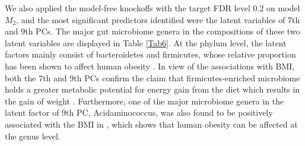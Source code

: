 \documentclass{statsoc}
\begin{document}
We also applied the model-free knockoffs \citep{Candes16} with the target FDR level $0.2$ on model $M_2$, and the most significant predictors identified were the latent variables of 7th and 9th PCs. The major gut microbiome genera in the compositions of these two latent variables are displayed in Table \ref{Tab6}. At the phylum level, the latent factors mainly consist of bacteroidetes and firmicutes, whose relative proportion has been shown to affect human obesity \citep{Ley2006}. In view of the associations with BMI, both the 7th and 9th PCs confirm the claim that firmicutes-enriched microbiome holds a greater metabolic potential for energy gain from the diet which results in the gain of weight \citep{Turnbaugh2006}. Furthermore, one of the major microbiome genera in the latent factor of 9th PC, Acidaminococcus, was also found to be positively associated with the BMI in \cite{Lin2014}, which shows that human obesity can be affected at the genus level.

\end{document}
